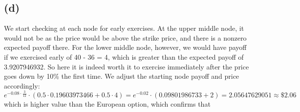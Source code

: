 \documentclass{article}
\begin{document}
{\subsection*{(d)}
We start checking at each node for early exercises. At the upper middle node, it would not be as the price would be above the strike price, and there is a nonzero expected payoff there. For the lower middle node, however, we would have payoff if we exercised early of 40 - 36 = 4, which is greater than the expected payoff of 3.9207946932. So here it is indeed worth it to exercise immediately after the price goes down by 10\% the first time. We adjust the starting node payoff and price accordingly:
\[
  e^{-0.08 \cdot \frac{3}{12}} \cdot (0.5 \cdot 0.19603973466 + 0.5 \cdot 4) = e^{-0.02} \cdot (0.09801986733 + 2) = 2.05647629051 \approx \boxed{\mathbf{\$2.06}}
\]
which is higher value than the European option, which confirms that  

}
\end{document}
